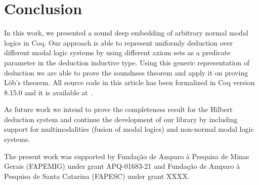 \documentclass[sigconf]{acmart}
\begin{document}

\section{Conclusion}\label{sec:conclusion}

In this work, we presented a sound deep embedding of arbitrary
normal modal logics in Coq. Our approach is able to represent uniformly
deduction over different modal logic systems by using different axiom sets
as a predicate parameter in the deduction inductive type. Using this generic
representation of deduction we are able to prove the soundness theorem and
apply it on proving L\"ob's theorem. All source code in this article has
been formalized in Coq version 8.15.0 and it is available at~\cite{modal-coq-lib}.


As future work we intend to prove the completeness result for the Hilbert
deduction system and continue the development of our library by including
support for multimodalities (fusion of modal logics) and non-normal modal
logic systems.

\begin{acks}
  The present work was supported by Fundação de Amparo à Pesquisa de Minas
  Gerais (FAPEMIG) under grant APQ-01683-21 and Fundação de Amparo à Pesquisa de
  Santa Catarina (FAPESC) under grant XXXX.
\end{acks}




\end{document}
